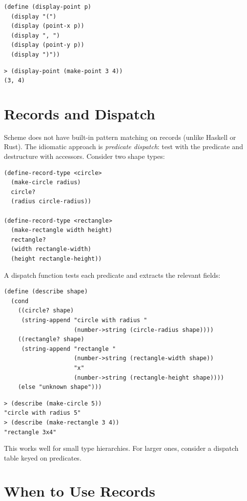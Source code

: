 \begin{lstlisting}
(define (display-point p)
  (display "(")
  (display (point-x p))
  (display ", ")
  (display (point-y p))
  (display ")"))
\end{lstlisting}

\begin{lstlisting}[style=repl]
> (display-point (make-point 3 4))
(3, 4)
\end{lstlisting}

\section{Records and Dispatch}

Scheme does not have built-in pattern matching on records (unlike Haskell or Rust). The idiomatic approach is \emph{predicate dispatch}: test with the predicate and destructure with accessors. Consider two shape types:

\begin{lstlisting}
(define-record-type <circle>
  (make-circle radius)
  circle?
  (radius circle-radius))

(define-record-type <rectangle>
  (make-rectangle width height)
  rectangle?
  (width rectangle-width)
  (height rectangle-height))
\end{lstlisting}

A dispatch function tests each predicate and extracts the relevant fields:

\begin{lstlisting}
(define (describe shape)
  (cond
    ((circle? shape)
     (string-append "circle with radius "
                    (number->string (circle-radius shape))))
    ((rectangle? shape)
     (string-append "rectangle "
                    (number->string (rectangle-width shape))
                    "x"
                    (number->string (rectangle-height shape))))
    (else "unknown shape")))
\end{lstlisting}

\begin{lstlisting}[style=repl]
> (describe (make-circle 5))
"circle with radius 5"
> (describe (make-rectangle 3 4))
"rectangle 3x4"
\end{lstlisting}

This works well for small type hierarchies. For larger ones, consider a dispatch table keyed on predicates.

\section{When to Use Records}

